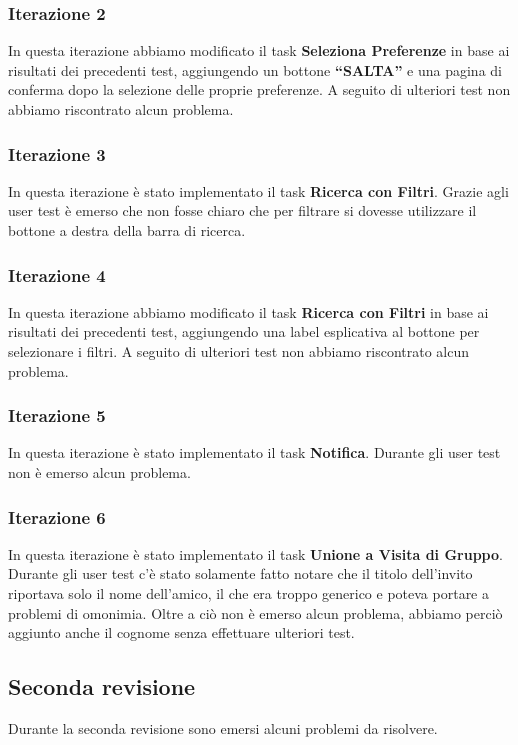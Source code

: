 \subsubsection{Iterazione 2}
In questa iterazione abbiamo modificato il task \textbf{Seleziona Preferenze} in base ai risultati dei precedenti test, aggiungendo un bottone \textbf{``SALTA''} e una pagina di conferma dopo la selezione delle proprie preferenze. A seguito di ulteriori test non abbiamo riscontrato alcun problema.

\subsubsection{Iterazione 3}
In questa iterazione è stato implementato il task \textbf{Ricerca con Filtri}.
Grazie agli user test è emerso che non fosse chiaro che per filtrare si dovesse utilizzare il bottone a destra della barra di ricerca.

\subsubsection{Iterazione 4}
In questa iterazione abbiamo modificato il task \textbf{Ricerca con Filtri} in base ai risultati dei precedenti test, aggiungendo una label esplicativa al bottone per selezionare i filtri. A seguito di ulteriori test non abbiamo riscontrato alcun problema.

\subsubsection{Iterazione 5}
In questa iterazione è stato implementato il task \textbf{Notifica}. Durante gli user test non è emerso alcun problema.

\subsubsection{Iterazione 6}
In questa iterazione è stato implementato il task \textbf{Unione a Visita di Gruppo}. Durante gli user test c'è stato solamente fatto notare che il titolo dell'invito riportava solo il nome dell'amico, il che era troppo generico e poteva portare a problemi di omonimia. Oltre a ciò non è emerso alcun problema, abbiamo perciò aggiunto anche il cognome senza effettuare ulteriori test.

\subsection{Seconda revisione}
Durante la seconda revisione sono emersi alcuni problemi da risolvere.

